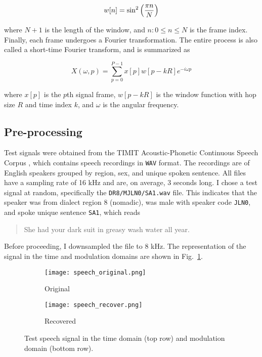 \begin{equation}
	\label{eq:hann-window}
	w[n] = \sin^2\qty(\frac{\pi n}{N})
\end{equation}

\noindent where $N + 1$ is the length of the window, and $n: 0 \leq n \leq N$ is the frame index. Finally, each frame undergoes a Fourier transformation. The entire process is also called a short-time Fourier transform, and is summarized as

\begin{equation}
	\label{eq:stft}
	X(\omega, p) = \sum_{p=0}^{P-1} x[p] w[p - kR] e^{-i\omega p}
\end{equation}

\noindent where $x[p]$ is the $p$th signal frame, $w[p - kR]$ is the window function with hop size $R$ and time index $k$, and $\omega$ is the angular frequency.

\subsection{Pre-processing}
\label{ssec:audio-speech-preprocess}
Test signals were obtained from the TIMIT Acoustic-Phonetic Continuous Speech Corpus \cite{timit}, which contains speech recordings in \texttt{WAV} format. The recordings are of English speakers grouped by region, sex, and unique spoken sentence. All files have a sampling rate of 16 kHz and are, on average, 3 seconds long. I chose a test signal at random, specifically the \texttt{DR8/MJLN0/SA1.wav} file. This indicates that the speaker was from dialect region 8 (nomadic), was male with speaker code \texttt{JLN0}, and spoke unique sentence \texttt{SA1}, which reads

\begin{quotation}
	She had your dark suit in greasy wash water all year.
\end{quotation}

Before proceeding, I downsampled the file to 8 kHz. The representation of the signal in the time and modulation domains are shown in Fig.~\ref{fig:speech-original}.

\begin{figure}[htb]
	\centering
	\begin{subfigure}{0.49\textwidth}
		\centering
		\texttt{[image: speech\_original.png]}
		\caption{Original}
		\label{fig:speech-original}
	\end{subfigure}
	\begin{subfigure}{0.49\textwidth}
		\centering
		\texttt{[image: speech\_recover.png]}
		\caption{Recovered}
		\label{fig:speech-recovered}
	\end{subfigure}
	\caption{Test speech signal in the time domain (top row) and modulation domain (bottom row).}
	\label{fig:speech}
\end{figure}

